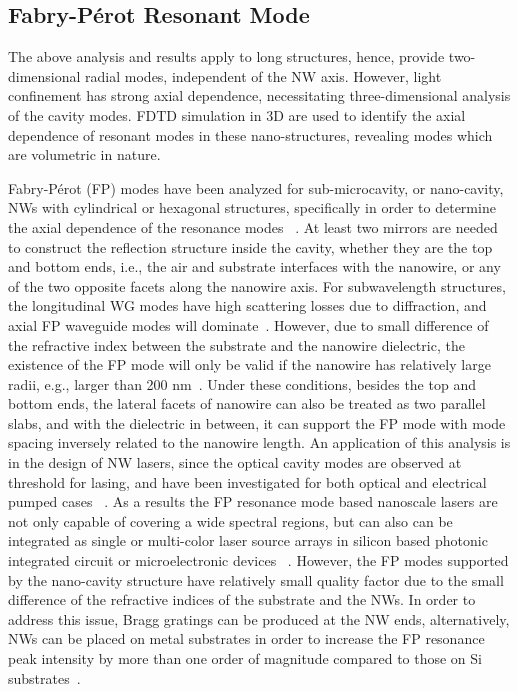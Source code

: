 \subsection{Fabry-P{\'e}rot Resonant Mode}

The above analysis and results apply to long structures, hence, provide
two-dimensional radial modes, independent of the NW axis. However, light
confinement has strong axial dependence, necessitating three-dimensional
analysis of the cavity modes. FDTD simulation in 3D are used to identify the
axial dependence of resonant modes in these nano-structures, revealing modes
which are volumetric in nature.

Fabry-P{\'e}rot (FP) modes have been analyzed for sub-microcavity, or nano-cavity,
NWs with cylindrical or hexagonal structures, specifically in order to
determine the axial dependence of the resonance modes ~\cite{Maslov:2003cq}. At
least two mirrors are needed to construct the reflection structure inside the
cavity, whether they are the top and bottom ends, i.e., the air and substrate
interfaces with the nanowire, or any of the two opposite facets along the
nanowire axis. For subwavelength structures, the longitudinal WG modes have
high scattering losses due to diffraction, and axial FP waveguide modes will
dominate~\cite{Johnson:2002ua}. However, due to small difference of the
refractive index between the substrate and the nanowire dielectric, the
existence of the FP mode will only be valid if the nanowire has relatively
large radii, e.g., larger than 200 nm~\cite{Hua:2007fn}. Under these
conditions, besides the top and bottom ends, the lateral facets of nanowire can
also be treated as two parallel slabs, and with the dielectric in between, it
can support the FP mode with mode spacing inversely related to the nanowire
length. An application of this analysis is in the design of NW lasers, since
the optical cavity modes are observed at threshold for lasing, and have been
investigated for both optical and electrical pumped cases
~\cite{Duan:2003en,Saxena:2015cn}. As a results the FP resonance mode based
nanoscale lasers are not only capable of covering a wide spectral regions, but
can also can be integrated as single or multi-color laser source arrays in
silicon based photonic integrated circuit or microelectronic devices
~\cite{Duan:2003en,Saxena:2015cn}. However, the FP modes supported by the
nano-cavity structure have relatively small quality factor due to the small
difference of the refractive indices of the substrate and the NWs. In order to
address this issue, Bragg gratings can be produced at the NW ends,
alternatively, NWs can be placed on metal substrates in order to increase the
FP resonance peak intensity by more than one order of magnitude compared to
those on Si substrates~\cite{Arab:2014wy}.

